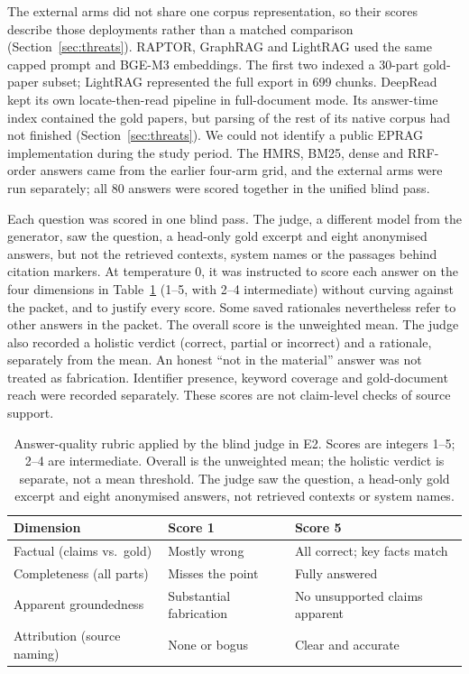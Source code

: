 The external arms did not share one corpus representation, so their scores
describe those deployments rather than a matched comparison
(Section~\ref{sec:threats}). RAPTOR, GraphRAG and LightRAG used the same
capped prompt and BGE-M3 embeddings. The first two indexed a 30-part gold-paper subset; LightRAG
represented the full export in 699 chunks. DeepRead kept its own
locate-then-read pipeline in full-document mode. Its answer-time index
contained the gold papers, but parsing of the rest of its native corpus had
not finished (Section~\ref{sec:threats}). We could not identify a public
EPRAG implementation during the study period. The HMRS, BM25, dense and
RRF-order answers came from the earlier four-arm grid, and the external arms
were run separately; all 80 answers were scored together in the unified
blind pass.

Each question was scored in one blind pass. The judge, a different model from the generator,
saw the question, a head-only gold excerpt and eight anonymised
answers, but not the retrieved contexts, system names or the passages behind
citation markers. At temperature 0, it was instructed to score each answer
on the four dimensions in Table~\ref{tab:rubric} (1--5, with 2--4
intermediate) without curving against the packet, and to justify every
score. Some saved rationales nevertheless refer to other answers in the
packet. The overall score is the unweighted mean. The judge also recorded a
holistic verdict (correct, partial or incorrect) and a rationale, separately
from the mean. An honest ``not in the material'' answer was not treated as
fabrication. Identifier presence, keyword coverage and gold-document reach
were recorded separately. These scores are not claim-level checks of source
support.

\begin{table}[!t]
\centering
\scriptsize
\setlength{\tabcolsep}{2.5pt}
\renewcommand{\arraystretch}{1.03}
\caption{Answer-quality rubric applied by the blind judge in E2. Scores are
integers 1--5; 2--4 are intermediate. Overall is the unweighted mean; the
holistic verdict is separate, not a mean threshold. The judge saw the
question, a head-only gold excerpt and eight anonymised answers, not
retrieved contexts or system names.}
\label{tab:rubric}
\begin{tabular}{@{}>{\raggedright\arraybackslash}p{}>{\raggedright\arraybackslash}p{}>{\raggedright\arraybackslash}p{}@{}}
\toprule
Dimension & Score 1 & Score 5\\
\midrule
Factual (claims vs.\ gold) & Mostly wrong & All correct; key facts match\\
Completeness (all parts) & Misses the point & Fully answered\\
Apparent groundedness & Substantial fabrication & No unsupported claims apparent\\
Attribution (source naming) & None or bogus & Clear and accurate\\
\bottomrule
\end{tabular}
\end{table}

